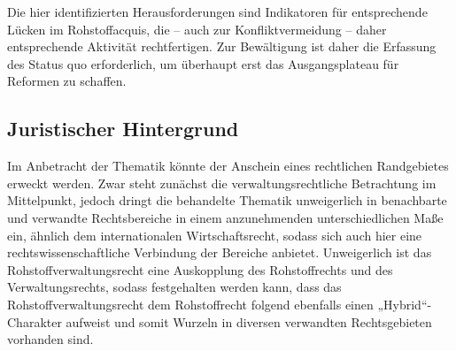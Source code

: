 \documentclass[12pt,a4paper,oneside]{book} %
\begin{document}
Die hier identifizierten Herausforderungen sind Indikatoren für entsprechende Lücken im Rohstoffacquis, die -- auch zur Konfliktvermeidung -- daher entsprechende Aktivität rechtfertigen. Zur Bewältigung ist daher die Erfassung des Status quo erforderlich, um überhaupt erst das Ausgangsplateau für Reformen zu schaffen.
	
	\subsection{Juristischer Hintergrund}
	Im Anbetracht der Thematik könnte der Anschein eines rechtlichen Randgebietes erweckt werden. Zwar steht zunächst die verwaltungsrechtliche Betrachtung im Mittelpunkt, jedoch dringt die behandelte Thematik unweigerlich in benachbarte und verwandte Rechtsbereiche in einem anzunehmenden unterschiedlichen Maße ein, ähnlich dem internationalen Wirtschaftsrecht, sodass sich auch hier eine rechtswissenschaftliche Verbindung der Bereiche anbietet. \autocite[1, 2]{herdegen_internationales_2020} Unweigerlich ist das Rohstoffverwaltungsrecht eine Auskopplung des Rohstoffrechts und des Verwaltungsrechts, sodass festgehalten werden kann, dass das Rohstoffverwaltungsrecht dem Rohstoffrecht folgend ebenfalls einen „Hybrid“-Charakter aufweist und somit Wurzeln in diversen verwandten Rechtsgebieten vorhanden sind. \autocite[358]{terhechte_konsolidierung_2015}
	
\end{document}
